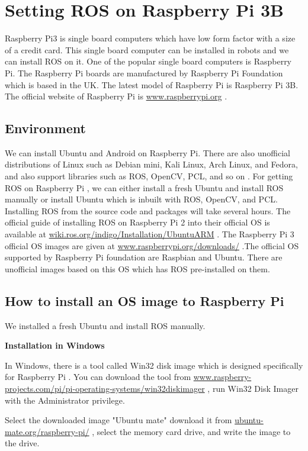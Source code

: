 \section{Setting ROS on Raspberry Pi 3B}

Raspberry Pi3 is single board computers which have low form factor with a size of a credit card. This single board computer can be installed in robots and we can install ROS on it.
One of the popular single board computers is Raspberry Pi. The Raspberry Pi boards are manufactured by Raspberry Pi Foundation which is based in the UK. The latest model of Raspberry Pi is Raspberry Pi 3B. The official website of Raspberry Pi is \url{www.raspberrypi.org} .

\subsection{Environment}
We can install Ubuntu and Android on Raspberry Pi. There are also unofficial distributions of Linux such as Debian mini, Kali Linux, Arch Linux, and Fedora, and also support libraries such as ROS, OpenCV, PCL, and so on .
For getting ROS on Raspberry Pi , we can either install a fresh Ubuntu and install ROS manually or install Ubuntu which is inbuilt with ROS, OpenCV, and PCL.
Installing ROS from the source code and packages will take several hours. 
The official guide of installing ROS on Raspberry Pi 2 into their official OS is available at \url{wiki.ros.org/indigo/Installation/UbuntuARM} .
The Raspberry Pi 3 official OS images are given at \url{www.raspberrypi.org/downloads/} .The official OS supported by Raspberry Pi foundation are Raspbian and Ubuntu. There are unofficial images based on this OS which has ROS pre-installed on them.

\subsection{How to install an OS image to Raspberry Pi}

We installed a fresh Ubuntu and install ROS manually. 

\textbf{Installation in Windows}

In Windows, there is a tool called Win32 disk image which is designed specifically for Raspberry Pi . You can download the tool from \url{www.raspberry-projects.com/pi/pi-operating-systems/win32diskimager} , run Win32 Disk Imager with the Administrator privilege.

Select the downloaded image  "Ubuntu mate" download it from \url{ubuntu-mate.org/raspberry-pi/} , select the memory card drive, and write the image to the drive.

